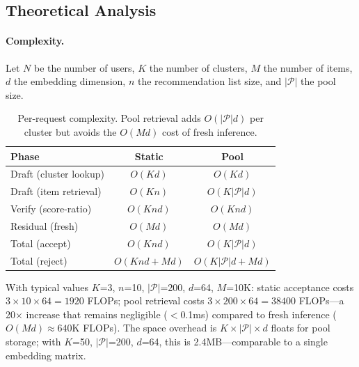 \documentclass[sigconf,nonacm=false]{acmart}
\begin{document}
\subsection{Theoretical Analysis}
\label{sec:theory}

\paragraph{Complexity.}
Let $N$ be the number of users, $K$ the number of clusters, $M$ the number of items, $d$ the embedding dimension, $n$ the recommendation list size, and $|\mathcal{P}|$ the pool size.

\begin{table}[t]
\centering
\caption{Per-request complexity. Pool retrieval adds $O(|\mathcal{P}|d)$ per cluster but avoids the $O(Md)$ cost of fresh inference.}
\label{tab:complexity}
\small
\begin{tabular}{lcc}
\toprule
\textbf{Phase} & \textbf{Static} & \textbf{Pool} \\
\midrule
Draft (cluster lookup) & $O(Kd)$ & $O(Kd)$ \\
Draft (item retrieval) & $O(Kn)$ & $O(K|\mathcal{P}|d)$ \\
Verify (score-ratio) & $O(Knd)$ & $O(Knd)$ \\
Residual (fresh) & $O(Md)$ & $O(Md)$ \\
\midrule
Total (accept) & $O(Knd)$ & $O(K|\mathcal{P}|d)$ \\
Total (reject) & $O(Knd + Md)$ & $O(K|\mathcal{P}|d + Md)$ \\
\bottomrule
\end{tabular}
\end{table}

With typical values $K$=3, $n$=10, $|\mathcal{P}|$=200, $d$=64, $M$=10K: static acceptance costs $3 \times 10 \times 64 = 1920$ FLOPs; pool retrieval costs $3 \times 200 \times 64 = 38400$ FLOPs---a 20$\times$ increase that remains negligible ($<$0.1ms) compared to fresh inference ($O(Md) \approx 640$K FLOPs). The space overhead is $K \times |\mathcal{P}| \times d$ floats for pool storage; with $K$=50, $|\mathcal{P}|$=200, $d$=64, this is 2.4MB---comparable to a single embedding matrix.
\end{document}
